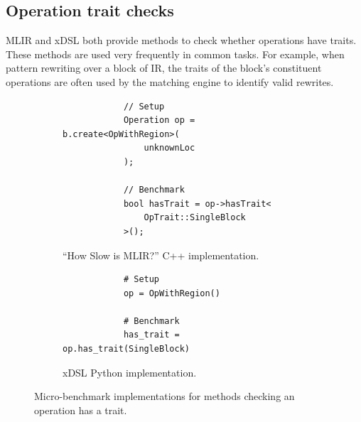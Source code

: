 \subsection{Operation trait checks}
\label{ssec:ubenchmark-trait-checks}

MLIR and xDSL both provide methods to check whether operations have traits.
These methods are used very frequently in common tasks. For example, when pattern rewriting over a block of IR, the traits of the block's constituent operations are often used by the matching engine to identify valid rewrites.


\begin{figure}[H]
    \centering
    \begin{subfigure}[b]{0.45\textwidth}
       \centering
        \begin{verbatim}
            // Setup
            Operation op = b.create<OpWithRegion>(
                unknownLoc
            );
            
            // Benchmark
            bool hasTrait = op->hasTrait<
                OpTrait::SingleBlock
            >();
        \end{verbatim}
        \caption{``How Slow is MLIR?'' C++ implementation.}
        \label{listing:ubenchmark-trait-checks-bench-mlir}
    \end{subfigure}
    \hfill
    \begin{subfigure}[b]{0.45\textwidth}
        \centering
        \begin{verbatim}
            # Setup
            op = OpWithRegion()
            
            # Benchmark
            has_trait = op.has_trait(SingleBlock)
        \end{verbatim}
        \footnotesize\vspace{2em}
        \caption{xDSL Python implementation.}
        \label{listing:ubenchmark-trait-checks-bench-xdsl}
    \end{subfigure}
    \vspace{1em}
    \captionsetup{name=Listing}
    \caption{Micro-benchmark implementations for methods checking an operation has a trait.}
    \label{listing:ubenchmark-trait-checks-bench}
\end{figure}

